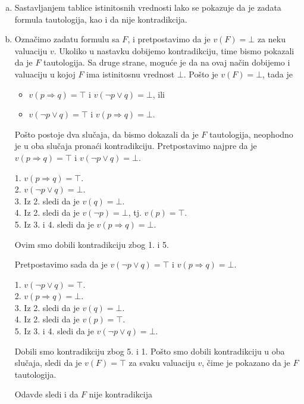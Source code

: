 \begin{enumerate}[(a)]
\[\begin{tabular}{c|c|c|c|c|c|c|c|c}
$\bot$ & $\bot$ & $\bot$ & $\bot$ & $\bot$ & $\bot$ & $\bot$ & $\bot$ & $\top$\\
\end{tabular}\]
Ovim smo pokazali da je $F$ tautologija i da nije kontradikcija.
\item Sastavljanjem tablice istinitosnih vrednosti lako se pokazuje da je zadata formula tautologija, kao i da nije kontradikcija.
\item Ozna\v cimo zadatu formulu sa $F$, i pretpostavimo da je $v(F)=\bot$ za neku valuaciju $v$. Ukoliko u nastavku dobijemo kontradikciju, time bismo pokazali da je $F$ tautologija. Sa druge strane, mogu\' ce je da na ovaj na\v cin dobijemo i valuaciju u kojoj $F$ ima istinitosnu vrednost $\bot$. Po\v sto je $v(F)=\bot$, tada je
\begin{itemize}
\item $v(p\Rightarrow q)=\top$ i $v(\neg p\vee q)=\bot$, ili
\item $v(\neg p\vee q)=\top$ i $v(p\Rightarrow q)=\bot$.
\end{itemize}
Po\v sto postoje dva slu\v caja, da bismo dokazali da je $F$ tautologija, neophodno je u oba slu\v caja prona\' ci kontradikciju. Pretpostavimo najpre da je $v(p\Rightarrow q)=\top$ i $v(\neg p\vee q)=\bot$.

1. $v(p\Rightarrow q)=\top$.\\
2. $v(\neg p\vee q)=\bot$.\\
3. Iz 2. sledi da je $v(q)=\bot$.\\
4. Iz 2. sledi da je $v(\neg p)=\bot$, tj. $v(p)=\top$.\\
5. Iz 3. i 4. sledi da je $v(p\Rightarrow q)=\bot$.

Ovim smo dobili kontradikciju zbog 1. i 5.

Pretpostavimo sada da je $v(\neg p\vee q)=\top$ i $v(p\Rightarrow q)=\bot$.

1. $v(\neg p\vee q)=\top$.\\
2. $v(p\Rightarrow q)=\bot$.\\
3. Iz 2. sledi da je $v(q)=\bot$.\\
4. Iz 2. sledi da je $v(p)=\top$.\\
5. Iz 3. i 4. sledi da je $v(\neg p\vee q)=\bot$.

Dobili smo kontradikciju zbog 5. i 1. Po\v sto smo dobili kontradikciju u oba slu\v caja, sledi da je $v(F)=\top$ za svaku valuaciju $v$, \v cime je pokazano da je $F$ tautologija.

Odavde sledi i da $F$ nije kontradikcija


\end{enumerate}
